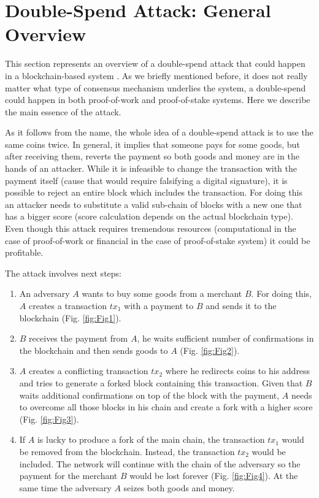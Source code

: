 \documentclass[10pt,a4paper]{article}
\numberwithin{equation}{section} %
\theoremstyle{plain}
\theoremstyle{definition}
\theoremstyle{remark}
\begin{document}
	
	\section{Double-Spend Attack: General Overview} \label{double-spend-attack-general-overview}
	
	This section represents an overview of a double-spend attack that could happen in a blockchain-based system \cite{bitcoinwiki}. As we briefly mentioned before, it does not really matter what type of consensus mechanism underlies the system, a double-spend could happen in both proof-of-work and proof-of-stake systems. Here we describe the main essence of the attack.
	
	As it follows from the name, the whole idea of a double-spend attack is to use the same coins twice. In general, it implies that someone pays for some goods, but after receiving them, reverts the payment so both goods and money are in the hands of an attacker. While it is infeasible to change the transaction with the payment itself (cause that would require falsifying a digital signature), it is possible to reject an entire block which includes the transaction. For doing this an attacker needs to substitute a valid sub-chain of blocks with a new one that has a bigger score (score calculation depends on the actual blockchain type). Even though this attack requires tremendous resources (computational in the case of proof-of-work or financial in the case of proof-of-stake system) it could be profitable.
	
	The attack involves next steps:
	\begin{enumerate}
        \item An adversary \(A\) wants to buy some goods from a merchant \(B\). For doing this, \(A\) creates a transaction \(tx_1\) with a payment to \(B\) and sends it to the blockchain (Fig. \ref{fig:Fig1}).
        \item \(B\) receives the payment from \(A\), he waits sufficient number of confirmations in the blockchain and then sends goods to \(A\) (Fig. \ref{fig:Fig2}).
        \item \(A\) creates a conflicting transaction \(tx_2\) where he redirects coins to his address and tries to generate a forked block containing this transaction. Given that \(B\) waits additional confirmations on top of the block with the payment, \(A\) needs to overcome all those blocks in his chain and create a fork with a higher score (Fig. \ref{fig:Fig3}).
        \item If \(A\) is lucky to produce a fork of the main chain, the transaction \(tx_1\) would be removed from the blockchain. Instead, the transaction \(tx_2\) would be included. The network will continue with the chain of the adversary so the payment for the merchant \(B\) would be lost forever (Fig. \ref{fig:Fig4}). At the same time the adversary \(A\) seizes both goods and money.
    \end{enumerate}
    
\end{document}
